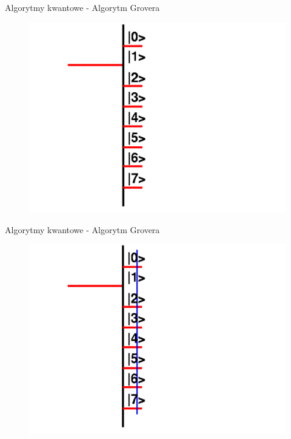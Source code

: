 \documentclass{beamer}
\begin{document}
	\begin{frame}{Algorytmy kwantowe - Algorytm Grovera}
		\vspace{0.5em}
		\begin{center}
			\begin{figure}
				\includegraphics[scale=0.35]{media/visualization5.png}
			\end{figure}
		\end{center}
		\vspace{0.5em}
	\end{frame}
	
	\begin{frame}{Algorytmy kwantowe - Algorytm Grovera}
		\vspace{0.5em}
		\begin{center}
			\begin{figure}
				\includegraphics[scale=0.28]{media/visualization6.png}
			\end{figure}
		\end{center}
		\vspace{0.5em}
	\end{frame}	
	
\end{document}
